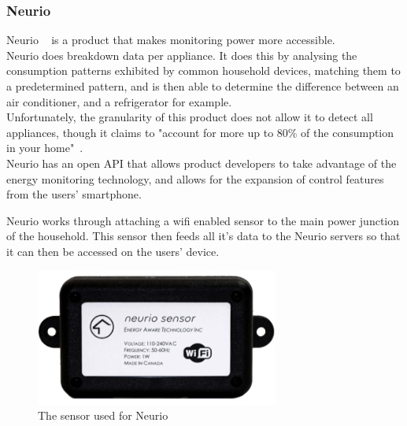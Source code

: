 \documentclass[preprint,12pt,3p]{elsarticle}
\begin{document}
\subsubsection{Neurio}

Neurio ~\cite{neurio} is a product that makes monitoring power more accessible.\\ 
Neurio does breakdown data per appliance. It does this by analysing the consumption patterns exhibited by common household devices, matching them to a predetermined pattern, and is then able to determine the difference between an air conditioner, and a refrigerator for example. \\
Unfortunately, the granularity of this product does not allow it to detect all appliances, though it claims to "account for more up to 80\% of the consumption in your home"~\cite{neurio-detection}.\\ Neurio has an open API that allows product developers to take advantage of the energy monitoring technology, and allows for the expansion of control features from the users' smartphone.

Neurio works through attaching a wifi enabled sensor to the main power junction of the household. This sensor then feeds all it's data to the Neurio servers so that it can then be accessed on the users' device.
\begin{figure}[h]
    \centering
    \includegraphics[width=8cm]{existing/neurio-sensor}
    \caption {The sensor used for Neurio}
\end{figure}
\end{document}
